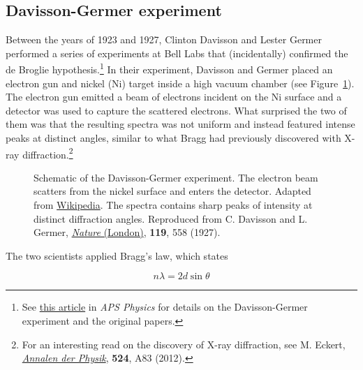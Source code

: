 
\subsection{Davisson-Germer experiment}
Between the years of 1923 and 1927, Clinton Davisson and Lester Germer performed a series of experiments at Bell Labs that (incidentally) confirmed the de Broglie hypothesis.\footnote{See \href{https://physics.aps.org/story/v17/st17}{this article} in \emph{APS Physics} for details on the Davisson-Germer experiment and the original papers.} In their experiment, Davisson and Germer placed an electron gun and nickel (Ni) target inside a high vacuum chamber (see Figure~\ref{fig:DG}). The electron gun emitted a beam of electrons incident on the Ni surface and a detector was used to capture the scattered electrons. What surprised the two of them was that the resulting spectra was not uniform and instead featured intense peaks at distinct angles, similar to what Bragg had previously discovered with X-ray diffraction.\footnote{For an interesting read on the discovery of X-ray diffraction, see M. Eckert, \href{http://onlinelibrary.wiley.com/doi/10.1002/andp.201200724/full}{\emph{Annalen der Physik}}, \textbf{524}, A83 (2012).} \par

\begin{figure}[!h]
	\centering
	\caption{\protect{} Schematic of the Davisson-Germer experiment. The electron beam scatters from the nickel surface and enters the detector. Adapted from \href{https://en.wikipedia.org/wiki/Davisson\%E2\%80\%93Germer\_experiment}{Wikipedia}. \protect{} The spectra contains sharp peaks of intensity at distinct diffraction angles. Reproduced from C. Davisson and L. Germer, \href{https://www.nature.com/nature/journal/v119/n2998/pdf/119558a0.pdf}{\emph{Nature} (London)}, \textbf{119}, 558 (1927).}
	\label{fig:DG}
\end{figure}

The two scientists applied Bragg's law, which states 

\begin{tcolorbox}[title=Bragg's law] \vspace{-2ex}
	\begin{equation}
		n\lambda = 2d\sin\theta \label{eq:bragg}
	\end{equation}
\end{tcolorbox}

